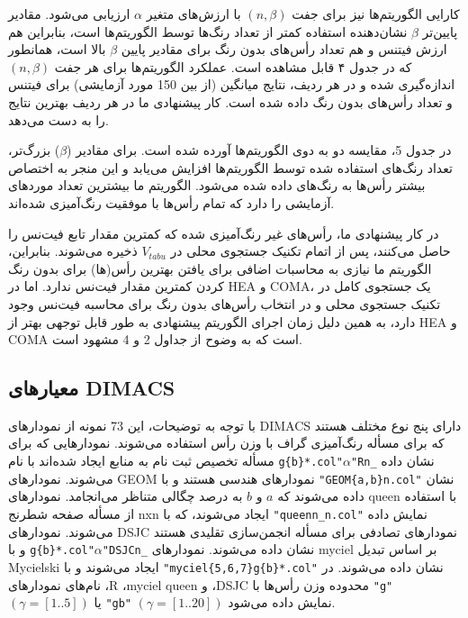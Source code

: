 \documentclass[a4paper,10pt]{article}
\begin{document}
                کارایی الگوریتم‌ها نیز برای جفت $(n, \beta)$ با ارزش‌های متغیر $\alpha$ ارزیابی می‌شود. مقادیر پایین‌تر $\beta$ نشان‌دهنده استفاده کمتر از تعداد رنگ‌ها توسط الگوریتم‌ها است، بنابراین هم ارزش فیتنس و هم تعداد رأس‌های بدون رنگ برای مقادیر پایین $\beta$ بالا است، همانطور که در جدول ۴ قابل مشاهده است. عملکرد الگوریتم‌ها برای هر جفت $(n, \beta)$ اندازه‌گیری شده و در هر ردیف، نتایج میانگین (از بین 150 مورد آزمایشی) برای فیتنس و تعداد رأس‌های بدون رنگ داده شده است. کار پیشنهادی ما در هر ردیف بهترین نتایج را به دست می‌دهد.

                در جدول 5، مقایسه دو به دوی الگوریتم‌ها آورده شده است. برای مقادیر ($\beta$) بزرگ‌تر، تعداد رنگ‌های استفاده شده توسط الگوریتم‌ها افزایش می‌یابد و این منجر به اختصاص بیشتر رأس‌ها به رنگ‌های داده شده می‌شود. الگوریتم ما بیشترین تعداد موردهای آزمایشی را دارد که تمام رأس‌ها با موفقیت رنگ‌آمیزی شده‌اند.

                در کار پیشنهادی ما، رأس‌های غیر رنگ‌آمیزی شده که کمترین مقدار تابع فیت‌نس را حاصل می‌کنند، پس از اتمام تکنیک جستجوی محلی در $V_{tabu}$ ذخیره می‌شوند. بنابراین، الگوریتم ما نیازی به محاسبات اضافی برای یافتن بهترین رأس(ها) برای بدون رنگ کردن کمترین مقدار فیت‌نس ندارد. اما در HEA و COMA، یک جستجوی کامل در تکنیک جستجوی محلی و در انتخاب رأس‌های بدون رنگ برای محاسبه فیت‌نس وجود دارد، به همین دلیل زمان اجرای الگوریتم پیشنهادی به طور قابل توجهی بهتر از HEA و COMA است که به وضوح از جداول 2 و 4 مشهود است.

        \subsection{معیارهای DIMACS}
            
            با توجه به توضیحات، این 73 نمونه از نمودارهای DIMACS دارای پنج نوع مختلف هستند که برای مسأله رنگ‌آمیزی گراف با وزن رأس استفاده می‌شوند. نمودارهایی که برای مسأله تخصیص ثبت نام به منابع ایجاد شده‌اند با نام 
            \texttt{g\{b\}*.col"$\alpha$"Rn\_}
            نشان داده می‌شوند. نمودارهای GEOM نمودارهای هندسی هستند و با 
            \texttt{"GEOM\{a,b\}n.col"}
            نشان داده می‌شوند که $a$ و $b$ به درصد چگالی متناظر می‌انجامد. نمودارهای queen با استفاده از مسأله صفحه شطرنج nxn ایجاد می‌شوند، که با
            \texttt{"queenn\_n.col"}
            نمایش داده می‌شوند. نمودارهای DSJC نمودارهای تصادفی برای مسأله انجمن‌سازی تقلیدی هستند و با 
            \texttt{g\{b\}*.col"$\alpha$"DSJCn\_}
            نشان داده می‌شوند. نمودارهای myciel بر اساس تبدیل Mycielski ایجاد می‌شوند و با
            \texttt{"myciel\{5,6,7\}g\{b\}*.col"}
            نشان داده می‌شوند. در نام‌های نمودارهای ،R ،myciel queen و ،DSJC محدوده وزن رأس‌ها با 
            \texttt{"g"}
            $(\gamma = [1..5])$ یا 
            \texttt{"gb"}
            $(\gamma = [1..20])$ نمایش داده می‌شود.
\end{document}
